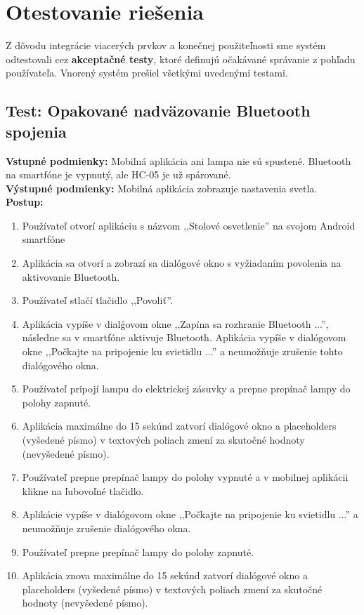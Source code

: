 \documentclass[12pt, a4paper]{article}
\begin{document}
\section{Otestovanie riešenia}
Z dôvodu integrácie viacerých prvkov a konečnej použiteľnosti sme systém odtestovali cez \textbf{akceptačné testy}, ktoré definujú očakávané správanie z pohľadu používateľa. Vnorený systém prešiel všetkými uvedenými testami.
\vspace{1em}

\subsection{Test: Opakované nadväzovanie Bluetooth spojenia}
\noindent\textbf{Vstupné podmienky:} Mobilná aplikácia ani lampa nie sú spustené. Bluetooth na smartfóne je vypnutý, ale HC-05 je už spárované. \\
\textbf{Výstupné podmienky:} Mobilná aplikácia zobrazuje nastavenia svetla. \\
\textbf{Postup:}
\begin{enumerate}
\itemsep0pt
\item Používateľ otvorí aplikáciu s názvom ,,Stolové osvetlenie'' na svojom Android smartfóne 
\item Aplikácia sa otvorí a zobrazí sa dialógové okno s vyžiadaním povolenia na aktivovanie Bluetooth.
\item Používateľ stlačí tlačidlo ,,Povoliť''.
\item Aplikácia vypíše v dialǵovom okne ,,Zapína sa rozhranie Bluetooth ...'', následne sa v smartfóne aktivuje Bluetooth. Aplikácia vypíše v dialógovom okne ,,Počkajte na pripojenie ku svietidlu ...'' a neumožňuje zrušenie tohto dialógového okna.
\item Používateľ pripojí lampu do elektrickej zásuvky a prepne prepínač lampy do polohy zapnuté.
\item Aplikácia maximálne do 15 sekúnd zatvorí dialógové okno a placeholders (vyšedené písmo) v textových poliach zmení za skutočné hodnoty (nevyšedené písmo).
\item Používateľ prepne prepínač lampy do polohy vypnuté a v mobilnej aplikácii klikne na ľubovoľné tlačidlo.
\item Aplikácie vypíše v dialógovom okne ,,Počkajte na pripojenie ku svietidlu ...'' a neumožňuje zrušenie dialógového okna.
\item Používateľ prepne prepínač lampy do polohy zapnuté.
\item Aplikácia znova maximálne do 15 sekúnd zatvorí dialógové okno a placeholders (vyšedené písmo) v textových poliach zmení za skutočné hodnoty (nevyšedené písmo).
\end{enumerate}
\end{document}
